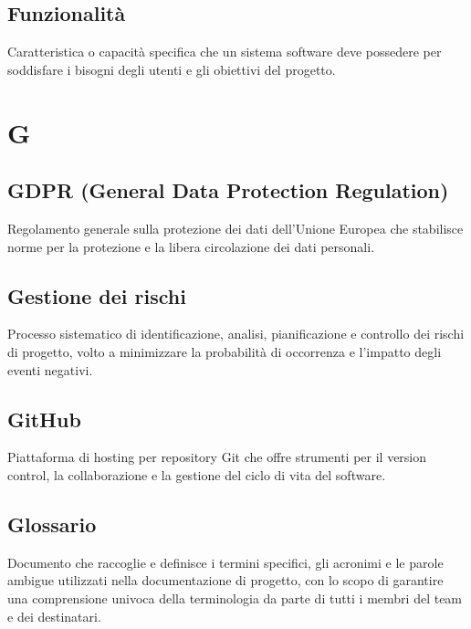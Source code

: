 \documentclass[a4paper,11pt]{article}
\begin{document}
\subsection{Funzionalità}
Caratteristica o capacità specifica che un sistema software deve possedere per soddisfare i bisogni degli utenti e gli obiettivi del progetto.

\newpage









\section{G}

\subsection{GDPR (General Data Protection Regulation)}
Regolamento generale sulla protezione dei dati dell'Unione Europea che stabilisce norme per la protezione e la libera circolazione dei dati personali.









\subsection{Gestione dei rischi}
Processo sistematico di identificazione, analisi, pianificazione e controllo dei rischi di progetto, volto a minimizzare la probabilità di occorrenza e l'impatto degli eventi negativi.









\subsection{GitHub}
Piattaforma di hosting per repository Git che offre strumenti per il version control, la collaborazione e la gestione del ciclo di vita del software.









\subsection{Glossario}
Documento che raccoglie e definisce i termini specifici, gli acronimi e le parole ambigue utilizzati nella documentazione di progetto, con lo scopo di garantire una comprensione univoca della terminologia da parte di tutti i membri del team e dei destinatari.
\end{document}
